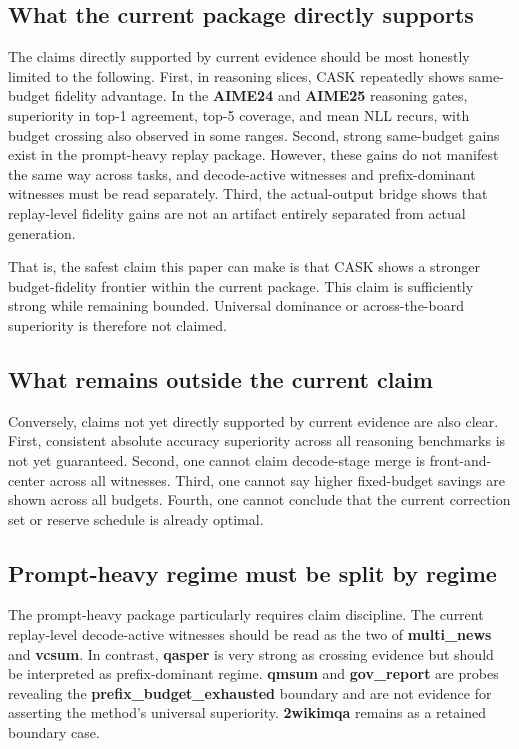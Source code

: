 \subsection{What the current package directly supports}


The claims directly supported by current evidence should be most honestly limited to the following. First, in reasoning slices, CASK repeatedly shows same-budget fidelity advantage. In the \textbf{AIME24} and \textbf{AIME25} reasoning gates, superiority in top-1 agreement, top-5 coverage, and mean NLL recurs, with budget crossing also observed in some ranges. Second, strong same-budget gains exist in the prompt-heavy replay package. However, these gains do not manifest the same way across tasks, and decode-active witnesses and prefix-dominant witnesses must be read separately. Third, the actual-output bridge shows that replay-level fidelity gains are not an artifact entirely separated from actual generation.


That is, the safest claim this paper can make is that CASK shows a stronger budget-fidelity frontier within the current package. This claim is sufficiently strong while remaining bounded. Universal dominance or across-the-board superiority is therefore not claimed.


\subsection{What remains outside the current claim}


Conversely, claims not yet directly supported by current evidence are also clear. First, consistent absolute accuracy superiority across all reasoning benchmarks is not yet guaranteed. Second, one cannot claim decode-stage merge is front-and-center across all witnesses. Third, one cannot say higher fixed-budget savings are shown across all budgets. Fourth, one cannot conclude that the current correction set or reserve schedule is already optimal.


\subsection{Prompt-heavy regime must be split by regime}


The prompt-heavy package particularly requires claim discipline. The current replay-level decode-active witnesses should be read as the two of \textbf{multi\_news} and \textbf{vcsum}. In contrast, \textbf{qasper} is very strong as crossing evidence but should be interpreted as prefix-dominant regime. \textbf{qmsum} and \textbf{gov\_report} are probes revealing the \textbf{prefix\_budget\_exhausted} boundary and are not evidence for asserting the method's universal superiority. \textbf{2wikimqa} remains as a retained boundary case.


